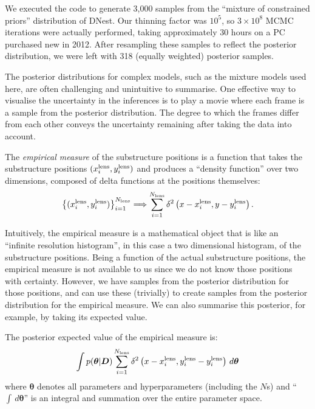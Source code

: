 \documentclass[useAMS,usenatbib]{mn2e}
\begin{document}
We executed the code to generate 3,000 samples from the ``mixture of
constrained priors'' distribution of DNest. Our thinning factor was $10^5$,
so $3 \times 10^8$ MCMC iterations were actually performed, taking approximately
30 hours on a PC purchased new in 2012. After resampling these samples to
reflect the posterior distribution, we were left with 318
(equally weighted) posterior samples.

The posterior distributions for complex models, such as the mixture models used here, are often challenging and unintuitive to summarise. One effective way
to visualise the uncertainty in the inferences is to play a movie where each
frame is a sample from the posterior distribution. The degree to which the
frames differ from each other conveys the uncertainty remaining after taking
the data into account.

The {\it empirical measure} of the substructure positions is a function that
takes the substructure positions $(x_i^{\rm lens}, y_i^{\rm lens})$ and
produces a ``density function'' over two dimensions, composed of delta
functions at the positions themselves:
\begin{eqnarray}
\left\{
(x_i^{\rm lens}, y_i^{\rm lens})
\right\}_{i=1}^{N_{\rm lens}}
\Longrightarrow
\sum_{i=1}^{N_{\rm lens}}
\delta^2\left(x - x_i^{\rm lens}, y - y_i^{\rm lens}\right).
\end{eqnarray}

Intuitively, the empirical measure is a mathematical object that is like
an ``infinite resolution histogram'', in this case a two dimensional histogram,
of the substructure positions.
Being a function of the actual substructure positions, the empirical measure
is not available to us since we do not know those positions with certainty.
However, we have samples from the posterior distribution for those positions,
and can use these (trivially) to create samples from the posterior distribution
for the empirical measure. We can also summarise this posterior, for example,
by taking its expected value.

The posterior expected value of the empirical measure is:
\begin{eqnarray}
\int p(\boldsymbol{\theta} | \boldsymbol{D})
\sum_{i=1}^{N_{\rm lens}}
\delta^2\left(x - x_i^{\rm lens}, y_i^{\rm lens} - y_i^{\rm lens}\right)
\, d\boldsymbol{\theta}
\end{eqnarray}
where $\boldsymbol{\theta}$ denotes all parameters and hyperparameters
(including the $N$s) and ``$\int \,d\boldsymbol{\theta}$'' is an integral and summation over the entire parameter space.
\end{document}
